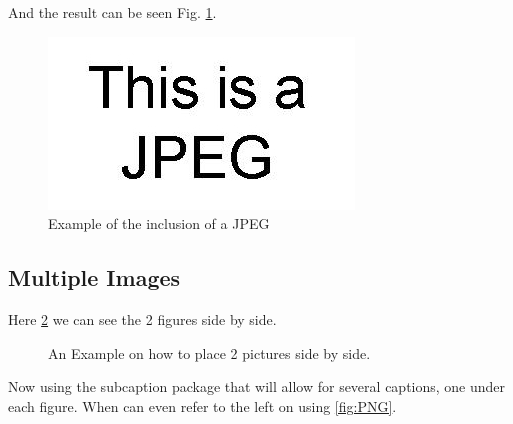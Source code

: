 \documentclass[12pt, a4paper,twoside]{article}
\begin{document}
And the result can be seen Fig. \ref{jpgfig}.

\begin{figure}[htp]
\begin{center}
\includegraphics[width=.3\textwidth]{figs/fig2}
\end{center}
\caption[Inclision of a JPEG]{Example of the inclusion of a JPEG}
\label{jpgfig}
\end{figure}


\subsection{Multiple Images}

Here \ref{fig:side} we can see the 2 figures side by side.

\begin{figure}[ht]
\centering
{}
\hspace{\fill}
\caption{An Example on how to place 2 pictures side by side.}
\label{fig:side}
\end{figure}

 Now using the subcaption package that will allow for several captions, one under each figure. When can even refer to the left on using \ref{fig:PNG}.
\end{document}
